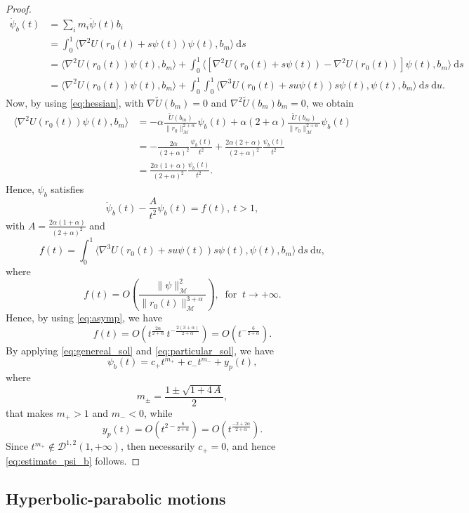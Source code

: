 \documentclass[a4paper,10pt]{amsart}
\newcommand{\ud}{\mathrm{d}}
\theoremstyle{plain}
\theoremstyle{definition}
\numberwithin{equation}{section}
\numberwithin{thm}{section}
\begin{document}
\begin{proof}
\[
\begin{split}
    \ddot \psi_b(t) &= \sum_{i} m_i\ddot\psi(t)b_i\\
    & = \int_{0}^{1}\langle\nabla^2 U(r_0(t) + s\psi(t))\psi(t),b_m\rangle\ \ud s\\
    & = \langle\nabla^2U(r_0(t))\psi(t),b_m\rangle + \int_{0}^{1} \langle[\nabla^2 U(r_0(t) + s\psi(t)) - \nabla^2 U(r_0(t))]\psi(t),b_m\rangle\ \ud s\\
    & = \langle\nabla^2U(r_0(t))\psi(t),b_m\rangle + \int_{0}^{1} \int_{0}^{1}\langle\nabla^3 U(r_0(t) + su\psi(t))s\psi(t),\psi(t),b_m\rangle\ \ud s\ \ud u.
\end{split}
\]
Now, by using \eqref{eq:hessian}, with $\nabla \tilde U(b_m)=0$ and $\nabla^2 \tilde U(b_m) b_m=0$, we obtain
\[
\begin{aligned}
\langle\nabla^2U(r_0(t))\psi(t),b_m\rangle &= - \alpha\frac{\tilde U(b_m)}{\|r_0\|_\mathcal{M}^{2+\alpha}}\psi_b(t) + \alpha(2+\alpha)\frac{\tilde U(b_m)}{\|r_0\|_\mathcal{M}^{2+\alpha}}\psi_b(t)
\\
&=-\frac{2\alpha}{(2+\alpha)^2}\frac{\psi_b(t)}{t^2} + \frac{2\alpha(2+\alpha)}{(2+\alpha)^2}\frac{\psi_b(t)}{t^2} 
\\
&= \frac{2\alpha(1+\alpha)}{(2+\alpha)^2}\frac{\psi_b(t)}{t^2}.
\end{aligned}
\]
Hence, $\psi_b$ satisfies
\begin{equation}
    \label{eq:psi_b}
\ddot\psi_b(t) - \frac{A}{t^2}\psi_b(t) = f(t), \ t>1,
\end{equation}
with $A=\frac{2\alpha(1+\alpha)}{(2+\alpha)^2}$ and 
\[
f(t) = \int_{0}^{1}\langle\nabla^3 U(r_0(t) + su\psi(t))s\psi(t),\psi(t),b_m\rangle\ \ud s\ \ud u,
\]
where
\[
f(t)=O\left(\frac{\|\psi\|_\mathcal{M}^2}{\|r_0(t)\|_\mathcal{M}^{3+\alpha}}\right), \ \mbox{ for } \ t \rightarrow+\infty.
\]
Hence, by using \eqref{eq:asymp}, we have
\[
f(t)=O(t^\frac{2\alpha}{2+\alpha}\,t^{-\frac{2(3+\alpha)}{2+\alpha}})=O(t^{-\frac{6}{2+\alpha}}).
\]
By applying \eqref{eq:genereal_sol} and \eqref{eq:particular_sol}, we have
\[
\psi_b(t)=c_+ t^{m_+} +c_- t^{m_-} + y_p(t),
\]
where
\[
m_\pm = \frac{1\pm \sqrt{1+4\,A}}{2},
\]
that makes $m_+>1$ and $m_-<0$,
while
\[
y_p(t)=O(t^{2-\frac{6}{2+\alpha}})=O(t^\frac{-2+2\alpha}{2+\alpha}).
\]
Since $t^{m_+} \notin \mathcal{D}^{1,2}(1,+\infty)$, then necessarily $c_+=0$, and hence \eqref{eq:estimate_psi_b} follows.
\end{proof}

\subsection{Hyperbolic-parabolic motions}
\end{document}
